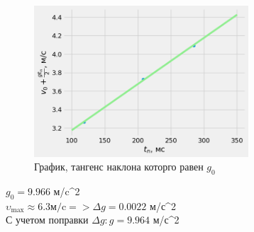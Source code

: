 \begin{figure}[ht]
  \centering
  \includegraphics[width=8cm]{рис-1.png}
  \centering
  \caption{График, тангенс наклона которго равен $g_0$}
\end{figure}
$g_0 = 9.966$ м/c^2\\ [6pt]
$\upsilon_{\text{max}} \approx 6.3 \text{м/c} => \Delta g = 0.0022$ м/с^2\\[6pt]
С учетом поправки $\Delta g: g = 9.964$ м/с^2



